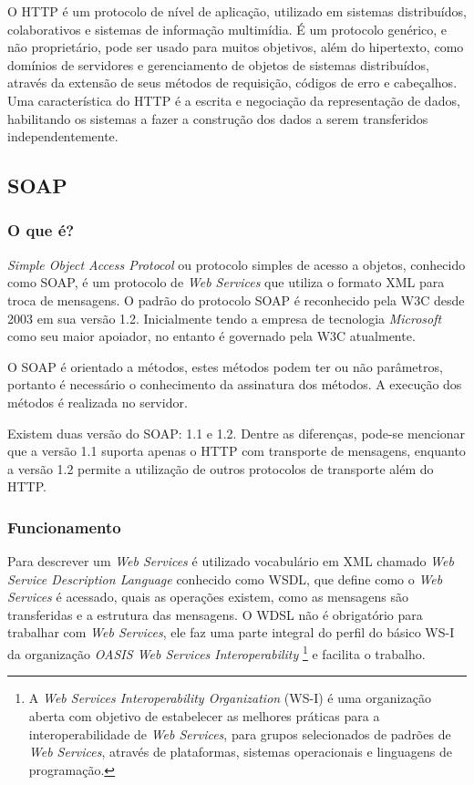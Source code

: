 \documentclass{acm_proc_article-sp}
\begin{document}
		O HTTP é um protocolo de nível de aplicação, utilizado em sistemas distribuídos, colaborativos e sistemas de informação multimídia. É um protocolo genérico, e não proprietário, pode ser usado para muitos objetivos, além do hipertexto, como domínios de servidores e gerenciamento de objetos de sistemas distribuídos, através da extensão de seus métodos de requisição, códigos de erro e cabeçalhos. Uma característica do HTTP é a escrita e negociação da representação de dados, habilitando os sistemas a fazer a construção dos dados a serem transferidos independentemente.\cite{HTTP-1.1}
	

	\subsection{SOAP}
	
		\subsubsection{O que é?}
	
			\emph{Simple Object Access Protocol} ou protocolo simples de acesso a objetos, conhecido como SOAP, é um protocolo de \emph{Web Services} que utiliza o formato XML para troca de mensagens. O padrão do protocolo SOAP é reconhecido pela W3C desde 2003 em sua versão 1.2. Inicialmente tendo a empresa de tecnologia \emph{Microsoft} como seu maior apoiador, no entanto é governado pela W3C atualmente.
		
			O SOAP é orientado a métodos, estes métodos podem ter ou não parâmetros, portanto é necessário o conhecimento da assinatura dos métodos. A execução dos métodos é realizada no servidor.
		
			Existem duas versão do SOAP: 1.1 e 1.2. Dentre as diferenças, pode-se mencionar que a versão 1.1 suporta apenas o HTTP com transporte de mensagens, enquanto a versão 1.2 permite a utilização de outros protocolos de transporte além do HTTP. \cite{WEBSERVICESZEND}
		
		\subsubsection{Funcionamento}
		
			Para descrever um \emph{Web Services} é utilizado vocabulário em XML chamado \emph{Web Service Description Language} conhecido como WSDL, que define como o \emph{Web Services} é acessado, quais as operações existem, como as mensagens são transferidas e a estrutura das mensagens. O WDSL não é obrigatório para trabalhar com \emph{Web Services}, ele faz uma parte integral do perfil do básico WS-I da organização \emph{OASIS Web Services Interoperability} \footnote{A \emph{Web Services Interoperability Organization} (WS-I) é uma organização aberta com objetivo de estabelecer as melhores práticas para a interoperabilidade de \emph{Web Services}, para grupos selecionados de padrões de \emph{Web Services}, através de plataformas, sistemas operacionais e linguagens de programação.\cite{OASIS-WS-I-SITE}} e facilita o trabalho. 
			
\end{document}
